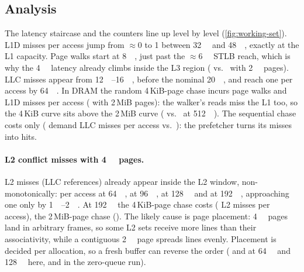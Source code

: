 \subsection{Analysis}
The latency staircase and the counters line up level by level (\cref{fig:working-set}). L1D misses per
access jump from \ensuremath{\approx}0 to 1 between \qty{32}{\kibi\byte} and \qty{48}{\kibi\byte}, exactly at
the L1 capacity. Page walks start at \qty{8}{\mebi\byte}, just past the \ensuremath{\approx}\qty{6}{\mebi\byte}
STLB reach, which is why the \qty{4}{\kibi\byte} latency already climbs inside the L3 region
( vs.\  with \qty{2}{\mebi\byte} pages).
LLC misses appear from \qtyrange{12}{16}{\mebi\byte}, before the nominal \qty{20}{\mebi\byte}, and reach one
per access by \qty{64}{\mebi\byte}. In DRAM the random 4\,KiB-page chase incurs 
page walks and  L1D misses per access ( with 2\,MiB pages):
the walker's reads miss the L1 too, so the 4\,KiB curve sits above the 2\,MiB curve
( vs.\  at
\qty{512}{\mebi\byte}). The sequential chase costs only 
( demand LLC misses per access vs.\ ): the prefetcher turns
its misses into hits.

\paragraph{L2 conflict misses with \qty{4}{\kibi\byte} pages.} L2 misses (LLC references) already appear
inside the L2 window, non-monotonically:  per access at \qty{64}{\kibi\byte},
 at \qty{96}{\kibi\byte},  at \qty{128}{\kibi\byte} and
 at \qty{192}{\kibi\byte}, approaching one only by \qtyrange{1}{2}{\mebi\byte}. At
\qty{192}{\kibi\byte} the 4\,KiB-page chase costs 
( L2 misses per access), the 2\,MiB-page chase 
(). The likely cause is page placement: \qty{4}{\kibi\byte} pages land in arbitrary
frames, so some L2 sets receive more lines than their associativity, while a contiguous \qty{2}{\mebi\byte}
page spreads lines evenly. Placement is decided per allocation, so a fresh buffer can reverse the order
( and  at \qty{64}{\kibi\byte} and
\qty{128}{\kibi\byte} here,  and  in the
zero-queue run).

